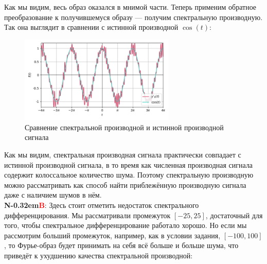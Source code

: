 \documentclass[a4paper]{article}
\newcommand\NB{\textbf{N\kern-0.32em\textcolor{red}{B}}}
\begin{document}
Как мы видим, весь образ оказался в мнимой части. Теперь применим обратное преобразование к получившемуся образу --- получим спектральную производную. Так она выглядит в сравнении с истинной производной $\cos(t)$:
\begin{figure}[H]
    \centering \includegraphics[width=0.66\textwidth]{sources/first/5_diff_cmp.png}
    \caption{Сравнение спектральной производной и истинной производной сигнала}
\end{figure}
Как мы видим, спектральная производная сигнала практически совпадает с истинной производной сигнала, в то время как численная производная сигнала содержит колоссальное количество шума. Поэтому спектральную производную можно рассматривать как способ найти приблежённую производную сигнала даже с наличием шумов в нём.\\[0.5em]
\NB: Здесь стоит отметить недостаток спектрального дифференцирования. Мы рассматривали промежуток $[-25, 25]$, достаточный для того, чтобы спектральное дифференцирование работало хорошо. Но если мы рассмотрим больший промежуток, например, как в условии задания, $[-100, 100]$, то Фурье-образ будет принимать на себя всё больше и больше шума, что приведёт к ухудшению качества спектральной производной:
\end{document}

